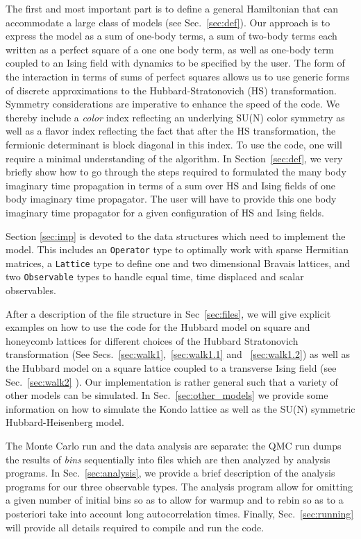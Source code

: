 The first and most important  part is to define a general Hamiltonian  that  can  accommodate a large class of models  (see Sec.~\ref{sec:def}). 
Our approach is to express the model as a sum of one-body terms, a sum of two-body terms each written as a perfect square of a one one body term, as well as one-body  term  coupled to an Ising field with  dynamics to be specified by the user. 
The form of the interaction in terms of sums of perfect squares allows us to use generic forms of  discrete  approximations to the  Hubbard-Stratonovich (HS)  transformation. 
Symmetry considerations  are  imperative to enhance the speed of the code.  
We thereby include a {\it color} index  reflecting  an underlying  SU(N) color symmetry as  well as a flavor index  reflecting  the fact that  after  the HS  transformation,  the  fermionic determinant is block diagonal in this index.   
To use the code, one will require a minimal understanding of the algorithm.  
In Section~\ref{sec:def}, we very briefly show how to go through  the steps required  to formulated the many body imaginary time propagation in terms of a sum  over HS and Ising fields  of one body  imaginary time propagator.   
The user will have to provide this one body imaginary time propagator for a given configuration of   HS and  Ising fields.   

Section \ref{sec:imp} is devoted to the data structures which  need to implement the model.  
This includes  an \texttt{Operator} type to  optimally work with sparse Hermitian matrices, a \texttt{Lattice} type  to define one and two dimensional Bravais lattices, and   two   \texttt{Observable} types to handle equal time, time displaced and scalar observables. 

After a description of the file structure  in Sec~\ref{sec:files},  we will give explicit examples on how to use the code for  the  Hubbard model on square and honeycomb lattices  for different choices of the Hubbard  Stratonovich transformation  (See Secs.~\ref{sec:walk1},~\ref{sec:walk1.1} and ~\ref{sec:walk1.2})  as well as the Hubbard model on a square lattice coupled to a transverse Ising field (see Sec.~\ref{sec:walk2} ).   Our implementation is rather general such that  a variety of other models can be simulated. In Sec.~\ref{sec:other_models}   we provide  some information on how to simulate the Kondo lattice as well as the SU(N) symmetric Hubbard-Heisenberg model. 

The Monte Carlo run and the  data analysis  are separate: the QMC run  dumps the results of {\it bins}  sequentially into files  which are then analyzed by  analysis programs. In Sec.~\ref{sec:analysis}, we provide a brief description of the analysis programs  for our three observable types.  The analysis program allow for omitting a given number of initial bins so as to allow for warmup and to rebin  so as to a posteriori take into account long autocorrelation times.  Finally, Sec.~\ref{sec:running}  will provide all details required to compile and run the code. 
